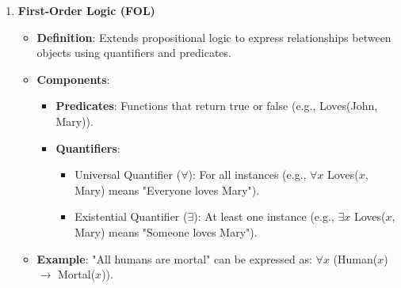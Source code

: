 \documentclass[aspectratio=169]{beamer}
\begin{document}
\begin{frame}[fragile]
\begin{enumerate}
        \item \textbf{First-Order Logic (FOL)}
        \begin{itemize}
            \item \textbf{Definition}: Extends propositional logic to express relationships between objects using quantifiers and predicates.
            \item \textbf{Components}:
            \begin{itemize}
                \item \textbf{Predicates}: Functions that return true or false (e.g., Loves(John, Mary)).
                \item \textbf{Quantifiers}:
                \begin{itemize}
                    \item Universal Quantifier ($\forall$): For all instances (e.g., $\forall x$ Loves($x$, Mary) means "Everyone loves Mary").
                    \item Existential Quantifier ($\exists$): At least one instance (e.g., $\exists x$ Loves($x$, Mary) means "Someone loves Mary").
                \end{itemize}
            \end{itemize}
            \item \textbf{Example}: "All humans are mortal" can be expressed as: $\forall x$ (Human($x$) $\rightarrow$ Mortal($x$)).
        \end{itemize}
    \end{enumerate}
\end{frame}
\end{document}
